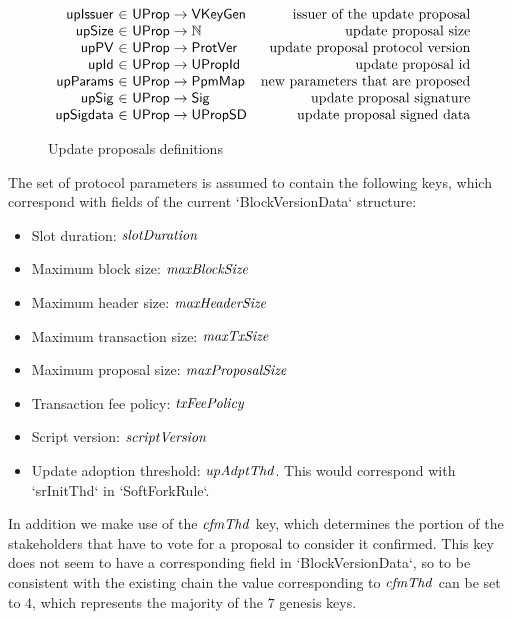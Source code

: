 \begin{figure}[htb]
  \begin{equation*}
    \begin{array}{r@{~\in~}lr}
      \fun{upIssuer} & \UProp \to \VKeyGen & \text{issuer of the update proposal}\\
      \fun{upSize} & \UProp \to \mathbb{N} & \text{update proposal size}\\
      \fun{upPV} & \UProp \to \ProtVer & \text{update proposal protocol version}\\
      \fun{upId} & \UProp \to \UPropId & \text{update proposal id}\\
      \fun{upParams} & \UProp \to \mathbb{\PPMMap}
                                           & \text{new parameters that are proposed}\\
      \fun{upSig} & \UProp \to \Sig & \text{update proposal signature}\\
      \fun{upSigdata} & \UProp \to \UPropSD & \text{update proposal signed data}
    \end{array}
  \end{equation*}
  \caption{Update proposals definitions}
  \label{fig:defs:update-proposals}
\end{figure}

The set of protocol parameters is assumed to contain the following keys, which
correspond with fields of the current `BlockVersionData` structure:
\begin{itemize}
\item Slot duration: $\mathit{slotDuration}$
\item Maximum block size: $\mathit{maxBlockSize}$
\item Maximum header size: $\mathit{maxHeaderSize}$
\item Maximum transaction size: $\mathit{maxTxSize}$
\item Maximum proposal size: $\mathit{maxProposalSize}$
\item Transaction fee policy: $\mathit{txFeePolicy}$
\item Script version: $\mathit{scriptVersion}$
\item Update adoption threshold: $\mathit{upAdptThd}$. This would correspond with
  `srInitThd` in `SoftForkRule`.
\end{itemize}
In addition we make use of the $\mathit{cfmThd}$ key, which determines the portion
of the stakeholders that have to vote for a proposal to consider it confirmed.
This key does not seem to have a corresponding field in `BlockVersionData`, so
to be consistent with the existing chain the value corresponding to
$\mathit{cfmThd}$ can be set to $4$, which represents the majority of the $7$
genesis keys.


